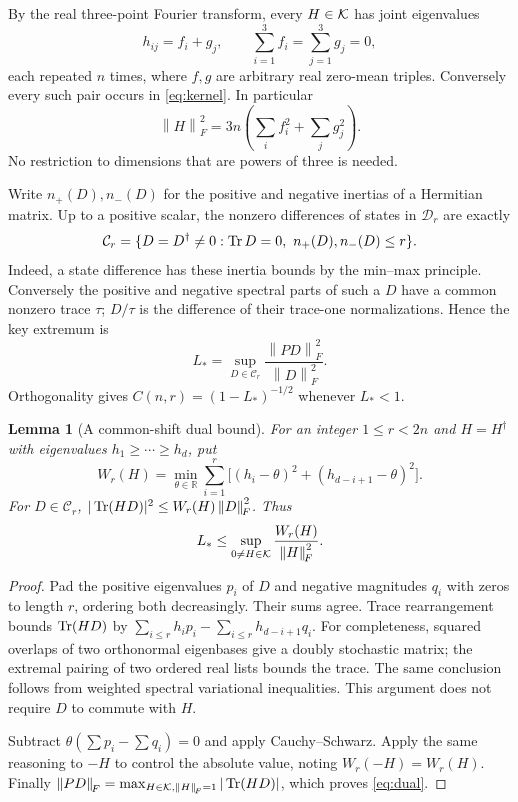 \documentclass[11pt,a4paper]{article}
\newtheorem{lemma}[theorem]{Lemma}
\theoremstyle{remark}\newtheorem{remark}[theorem]{Remark}
\newcommand{\DD}{\mathcal D}\newcommand{\norm}[1]{\left\|#1\right\|_{\!F}}
\begin{document}
By the real three-point Fourier transform, every $H\in\mathcal K$ has joint
eigenvalues
\begin{equation}\label{eq:grid}
 h_{ij}=f_i+g_j,\qquad
 \sum_{i=1}^3 f_i=\sum_{j=1}^3g_j=0,
\end{equation}
each repeated $n$ times, where $f,g$ are arbitrary real zero-mean
triples. Conversely every such pair occurs in \eqref{eq:kernel}. In
particular
\begin{equation}\label{eq:gridnorm}
 \norm H^2=3n\left(\sum_i f_i^2+\sum_jg_j^2\right).
\end{equation}
No restriction to dimensions that are powers of three is needed.

Write $n_+(D),n_-(D)$ for the positive and negative inertias of a
Hermitian matrix. Up to a positive scalar, the nonzero differences of
states in $\DD_r$ are exactly
\[
 \mathcal C_r=\{D=D^\dagger\ne0:\operatorname{Tr} D=0,\ n_+(D),n_-(D)\le r\}.
\]
Indeed, a state difference has these inertia bounds by the min--max
principle. Conversely the positive and negative spectral parts of such
a $D$ have a common nonzero trace $\tau$; $D/\tau$ is the difference of
their trace-one normalizations. Hence the key extremum is
\begin{equation}\label{eq:energy}
 L_*=\sup_{D\in\mathcal C_r}\frac{\norm{PD}^2}{\norm D^2}.
\end{equation}
Orthogonality gives $C(n,r)=(1-L_*)^{-1/2}$ whenever $L_*<1$.

\begin{lemma}[A common-shift dual bound]\label{lem:dual}
For an integer $1\le r<2n$ and $H=H^\dagger$ with eigenvalues
$h_1\ge\cdots\ge h_d$, put
\[
 W_r(H)=\min_{\theta\in\mathbb R}
       \sum_{i=1}^r\bigl[(h_i-\theta)^2+(h_{d-i+1}-\theta)^2\bigr].
\]
For $D\in\mathcal C_r$, $|\Tr(HD)|^2\le W_r(H)\norm D^2$. Thus
\begin{equation}\label{eq:dual}
 L_*\le\sup_{0\ne H\in\K}\frac{W_r(H)}{\norm H^2}.
\end{equation}
\end{lemma}
\begin{proof}
Pad the positive eigenvalues $p_i$ of $D$ and negative magnitudes $q_i$
with zeros to length $r$, ordering both decreasingly. Their sums agree.
Trace rearrangement bounds $\operatorname{Tr}(HD)$ by
$\sum_{i\le r}h_i p_i-\sum_{i\le r}h_{d-i+1}q_i$.
For completeness, squared overlaps of two orthonormal eigenbases give a
doubly stochastic matrix; the extremal pairing of two ordered real
lists bounds the trace. The same conclusion follows from weighted
spectral variational inequalities. This argument does not require $D$
to commute with $H$.

Subtract $\theta(\sum p_i-\sum q_i)=0$ and apply Cauchy--Schwarz.
Apply the same reasoning to $-H$ to control the absolute value, noting
$W_r(-H)=W_r(H)$. Finally
$\norm{PD}=\max_{H\in\K,\norm H=1}|\Tr(HD)|$, which proves
\eqref{eq:dual}.
\end{proof}
\end{document}
